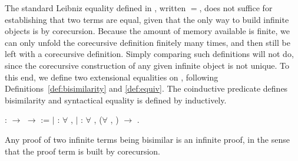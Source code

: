 The standard Leibniz equality defined in \Coq, written $=$, does not suffice
for establishing that two terms are equal, given that the only way to build
infinite objects is by corecursion. Because the amount of memory available is
finite, we can only unfold the corecursive definition finitely many times, and
then still be left with a corecursive definition. Simply comparing such
definitions will not do, since the corecursive construction of any given
infinite object is not unique. To this end, we define two extensional
equalities on , following
Definitions~\ref{def:bisimilarity} and \ref{def:equiv}. The coinductive
predicate  defines bisimilarity and
syntactical equality is defined by 
inductively.
\begin{singlespace}
\begin{coqdoccode}
\coqdocnoindent
{}
 :
 \ensuremath{\rightarrow}
 \ensuremath{\rightarrow}
 :=\coqdoceol
\coqdocindent{1.00em}
\ensuremath{|}
 :
\ensuremath{\forall} ,
 
 \coqdoceol
\coqdocindent{1.00em}
\ensuremath{|}
 :
\ensuremath{\forall}   ,
(\ensuremath{\forall} ,
 
 )
\ensuremath{\rightarrow}
 
 
.\coqdoceol
\end{coqdoccode}
\end{singlespace}
Any proof of two infinite terms being bisimilar is an infinite proof, in the
sense that the proof term is built by corecursion.
